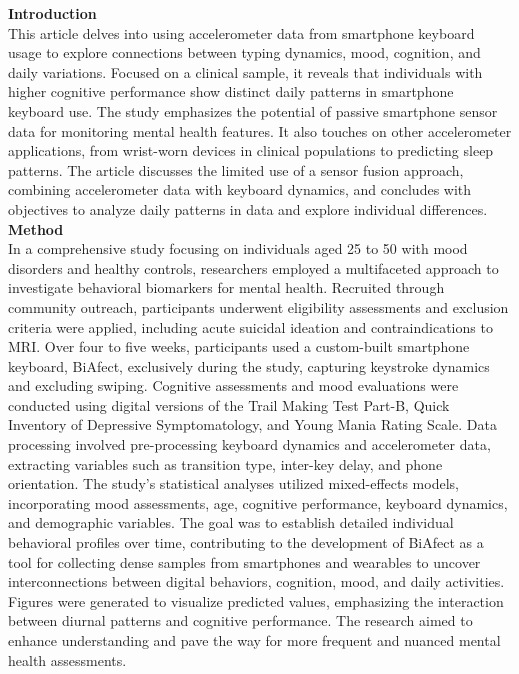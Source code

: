 \documentclass[11pt]{report}
\begin{document}
\textbf{Introduction} \\
This article \cite{research-3} delves into using accelerometer data from smartphone keyboard usage to explore connections between typing dynamics, mood, cognition, and daily variations. Focused on a clinical sample, it reveals that individuals with higher cognitive performance show distinct daily patterns in smartphone keyboard use. The study emphasizes the potential of passive smartphone sensor data for monitoring mental health features. It also touches on other accelerometer applications, from wrist-worn devices in clinical populations to predicting sleep patterns. The article discusses the limited use of a sensor fusion approach, combining accelerometer data with keyboard dynamics, and concludes with objectives to analyze daily patterns in data and explore individual differences.\vspace{5mm} \\
\textbf{Method} \\
In a comprehensive study focusing on individuals aged 25 to 50 with mood disorders and healthy controls, researchers employed a multifaceted approach to investigate behavioral biomarkers for mental health. Recruited through community outreach, participants underwent eligibility assessments and exclusion criteria were applied, including acute suicidal ideation and contraindications to MRI. Over four to five weeks, participants used a custom-built smartphone keyboard, BiAfect, exclusively during the study, capturing keystroke dynamics and excluding swiping. Cognitive assessments and mood evaluations were conducted using digital versions of the Trail Making Test Part-B, Quick Inventory of Depressive Symptomatology, and Young Mania Rating Scale. Data processing involved pre-processing keyboard dynamics and accelerometer data, extracting variables such as transition type, inter-key delay, and phone orientation. The study's statistical analyses utilized mixed-effects models, incorporating mood assessments, age, cognitive performance, keyboard dynamics, and demographic variables. The goal was to establish detailed individual behavioral profiles over time, contributing to the development of BiAfect as a tool for collecting dense samples from smartphones and wearables to uncover interconnections between digital behaviors, cognition, mood, and daily activities. Figures were generated to visualize predicted values, emphasizing the interaction between diurnal patterns and cognitive performance. The research aimed to enhance understanding and pave the way for more frequent and nuanced mental health assessments.
\end{document}
